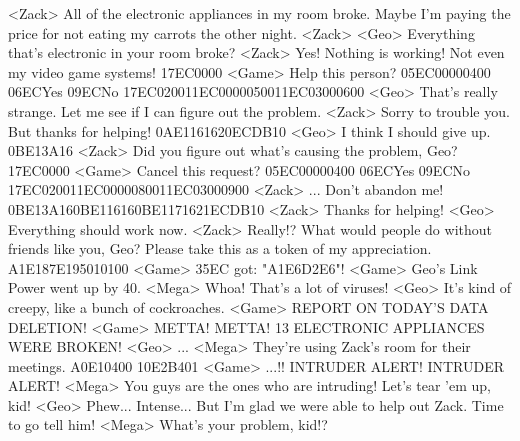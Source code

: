 <Zack> All of the electronic appliances in my room broke. 
Maybe I'm paying the price for not eating my carrots the other night. 
<Zack> 
<Geo> Everything that's electronic in your room broke? 
<Zack> Yes! 
Nothing is working! Not even my video game systems! 
{17}{EC}{00}{00} 
<Game> Help this person? {05}{EC}{00}{00}{04}{00}  {06}{EC}Yes   {09}{EC}No 
{17}{EC}{02}{00}{11}{EC}{00}{00}{05}{00}{11}{EC}{03}{00}{06}{00}
<Geo> That's really strange. Let me see if I can figure out the problem. 
<Zack> Sorry to trouble you. But thanks for helping! 
{0A}{E1}{16}{16}{20}{EC}{DB}{10}
<Geo> I think I should give up. 
{0B}{E1}{3A}{16}
<Zack> Did you figure out what's causing the problem, Geo? 
{17}{EC}{00}{00} 
<Game> Cancel this request? {05}{EC}{00}{00}{04}{00}  {06}{EC}Yes   {09}{EC}No 
{17}{EC}{02}{00}{11}{EC}{00}{00}{08}{00}{11}{EC}{03}{00}{09}{00}
<Zack> ... Don't abandon me! 
{0B}{E1}{3A}{16}{0B}{E1}{16}{16}{0B}{E1}{17}{16}{21}{EC}{DB}{10}
<Zack> Thanks for helping! 
<Geo> Everything should work now. 
<Zack> Really!? 
What would people do without friends like you, Geo? 
Please take this as a token of my appreciation. 
{A1}{E1}{87}{E1}{95}{01}{01}{00} 
<Game> {35}{EC} got: "{A1}{E6}{D2}{E6}"! 
<Game> Geo's Link Power went up by 40. 
<Mega> Whoa! That's a lot of viruses! 
<Geo> It's kind of creepy, like a bunch of cockroaches. 
<Game> REPORT ON TODAY'S DATA DELETION! 
<Game> METTA! METTA! 
13 ELECTRONIC APPLIANCES WERE BROKEN! 
<Geo> ... 
<Mega> They're using Zack's room for their meetings. 
{A0}{E1}{04}{00} {10}{E2}{B4}{01} 
<Game> ...!! 
INTRUDER ALERT! INTRUDER ALERT! 
<Mega> You guys are the ones who are intruding! 
Let's tear 'em up, kid! 
<Geo> Phew... 
Intense... 
But I'm glad we were able to help out Zack. Time to go tell him! 
<Mega> What's your problem, kid!? 
